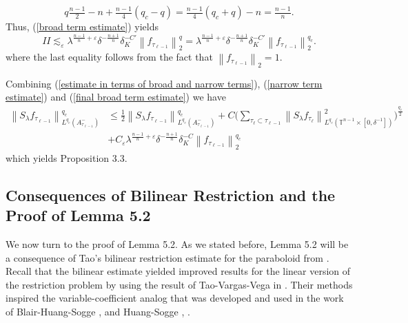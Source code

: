 \documentclass[11pt]{amsart}
\numberwithin{equation}{section}
\newcommand{\Tn}{\mathbb{T}^{n-1}}
\newcommand{\la}{\lambda}
\newcommand\norm[1]{\left\lVert#1\right\rVert}
\newcommand{\lpnorm}[3]{\norm{#1}_{L^{#2}(#3)}}
\newcommand{\altlpnorm}[2]{\norm{#1}_{#2}}
\newcommand{\Sl}{S_{\la}}
\newcommand{\dK}[1]{\delta_{K}^{#1}}
\begin{document}
\begin{equation}
    q\tfrac{n-1}{2} - n + \tfrac{n-1}{4}(q_c - q) = \tfrac{n-1}{4}(q_c + q) - n = \tfrac{n-1}{n}.
\end{equation}
Thus, (\ref{broad term estimate}) yields
\begin{equation} \label{final broad term estimate}
    II \lesssim_{\varepsilon} \la^{\frac{n-1}{n} + \varepsilon}\delta^{-\frac{n+1}{n}}\dK{-C'}\altlpnorm{f_{\tau_{\ell - 1}}}{2}^{q} = \la^{\frac{n-1}{n} + \varepsilon}\delta^{-\frac{n+1}{n}}\dK{-C'}\altlpnorm{f_{\tau_{\ell - 1}}}{2}^{q_c}.
\end{equation}
where the last equality follows from the fact that $\altlpnorm{f_{\tau_{\ell-1}}}{2} = 1$.

Combining (\ref{estimate in terms of broad and narrow terms}), (\ref{narrow term estimate}) and (\ref{final broad term estimate}) we have 
\begin{equation}
\begin{split}
        \lpnorm{\Sl f_{\tau_{\ell - 1}}}{q_c}{A_{\tau_{\ell - 1}}^{-}}^{q_c} &\leq \frac{1}{2}\lpnorm{\Sl f_{\tau_{\ell - 1}}}{q_c}{A_{\tau_{\ell - 1}}^{-}}^{q_c} + C\Big( \sum_{\tau_{\ell} \subset \tau_{\ell - 1}}\lpnorm{\Sl f_{\tau_{\ell}}}{q_c}{\Tn \times [0, \delta^{-1}]}^2\Big)^{\frac{q_c}{2}} \\
        &+ C_{\varepsilon}\la^{\frac{n-1}{n} + \varepsilon}\delta^{-\frac{n+1}{n}}\dK{-C}\altlpnorm{f_{\tau_{\ell - 1}}}{2}^{q_c}
\end{split}
\end{equation}
which yields Proposition 3.3.










\subsection{Consequences of Bilinear Restriction and the Proof of Lemma 5.2}
We now turn to the proof of Lemma 5.2. As we stated before, Lemma 5.2 will be a consequence of Tao's bilinear restriction estimate for the paraboloid from \cite{taobilinear}. Recall that the bilinear estimate yielded improved results for the linear version of the restriction problem by using the result of Tao-Vargas-Vega in \cite{TaoVargasVega1998}. Their methods inspired the variable-coefficient analog that was developed and used in the work of Blair-Huang-Sogge \cite{BlairHuangSoggeImprovedSpectral}, \cite{BlairHuangSoggeStrichartz} and Huang-Sogge \cite{HuangSoggeStrichartz}, \cite{huang2024curvature}. 
\end{document}
